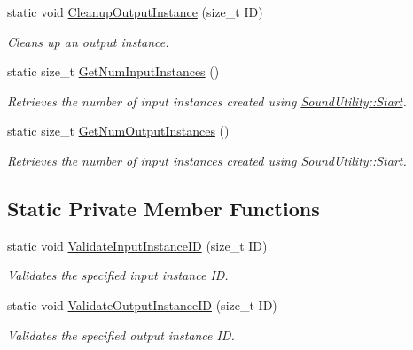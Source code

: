 \begin{DoxyCompactItemize}
static void \hyperlink{class_sound_utility_a68ce68bd9b5c206ed2b70252b4e9b976}{CleanupOutputInstance} (size\_\-t ID)
\begin{DoxyCompactList}\small\item\em Cleans up an output instance. \item\end{DoxyCompactList}\item 
static size\_\-t \hyperlink{class_sound_utility_af740d16e8f9e50fe848c00882287ddbe}{GetNumInputInstances} ()
\begin{DoxyCompactList}\small\item\em Retrieves the number of input instances created using \hyperlink{class_sound_utility_a0d97dbcba90c9e50e4987c80d63a1c17}{SoundUtility::Start}. \item\end{DoxyCompactList}\item 
static size\_\-t \hyperlink{class_sound_utility_ab42f09f062637d879046c2bb851a773f}{GetNumOutputInstances} ()
\begin{DoxyCompactList}\small\item\em Retrieves the number of input instances created using \hyperlink{class_sound_utility_a0d97dbcba90c9e50e4987c80d63a1c17}{SoundUtility::Start}. \item\end{DoxyCompactList}\end{DoxyCompactItemize}
\subsection*{Static Private Member Functions}
\begin{DoxyCompactItemize}
\item 
static void \hyperlink{class_sound_utility_ae5191b4343c8d8a536c76ad47730c1e3}{ValidateInputInstanceID} (size\_\-t ID)
\begin{DoxyCompactList}\small\item\em Validates the specified input instance ID. \item\end{DoxyCompactList}\item 
static void \hyperlink{class_sound_utility_ac6afa82aa1f2fd63c4140c1911845737}{ValidateOutputInstanceID} (size\_\-t ID)
\begin{DoxyCompactList}\small\item\em Validates the specified output instance ID. \item\end{DoxyCompactList}\end{DoxyCompactItemize}
